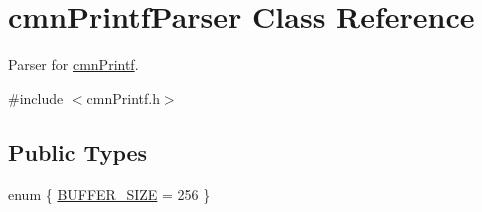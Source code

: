 \hypertarget{classcmn_printf_parser}{\section{cmn\-Printf\-Parser Class Reference}
\label{classcmn_printf_parser}
}


Parser for \hyperlink{classcmn_printf}{cmn\-Printf}.  




{\ttfamily \#include $<$cmn\-Printf.\-h$>$}

\subsection*{Public Types}
\begin{DoxyCompactItemize}
\item 
enum \{ \hyperlink{classcmn_printf_parser_a2dbb69cb7aa030799fad9b8d7a1857d5af9f1fd3238867d902ee69418278958a9}{B\-U\-F\-F\-E\-R\-\_\-\-S\-I\-Z\-E} = 256
 \}
\end{DoxyCompactItemize}
